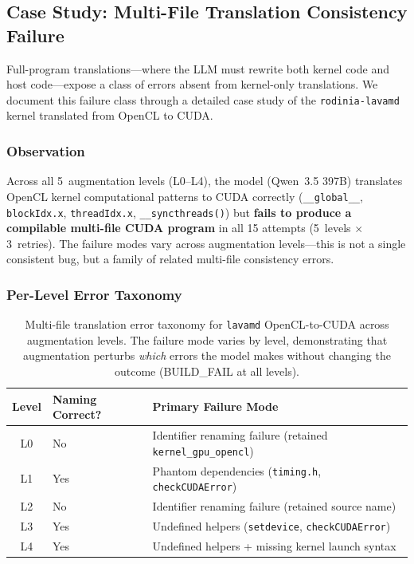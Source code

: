 \subsection{Case Study: Multi-File Translation Consistency Failure}
\label{sec:appendix-c5}

Full-program translations---where the LLM must rewrite both kernel code and host
code---expose a class of errors absent from kernel-only translations. We
document this failure class through a detailed case study of the
\texttt{rodinia-lavamd} kernel translated from OpenCL to CUDA.

\subsubsection*{Observation}

Across all 5~augmentation levels (L0--L4), the model (Qwen~3.5 397B) translates
OpenCL kernel computational patterns to CUDA correctly (\texttt{\_\_global\_\_},
\texttt{blockIdx.x}, \texttt{threadIdx.x}, \texttt{\_\_syncthreads()}) but
\textbf{fails to produce a compilable multi-file CUDA program} in all 15
attempts (5~levels $\times$ 3~retries). The failure modes vary across
augmentation levels---this is not a single consistent bug, but a family of
related multi-file consistency errors.

\subsubsection*{Per-Level Error Taxonomy}

\begin{table}[htbp]
  \centering
  \caption{Multi-file translation error taxonomy for \texttt{lavamd}
    OpenCL-to-CUDA across augmentation levels. The failure mode varies by level,
    demonstrating that augmentation perturbs \emph{which} errors the model makes
    without changing the outcome (BUILD\_FAIL at all levels).}
  \label{tab:lavamd-errors}
  \small
  \begin{tabular}{@{}clp{4.2cm}@{}}
    \toprule
    Level & Naming Correct? & Primary Failure Mode \\
    \midrule
    L0 & No  & Identifier renaming failure (retained \texttt{kernel\_gpu\_opencl}) \\
    L1 & Yes & Phantom dependencies (\texttt{timing.h}, \texttt{checkCUDAError}) \\
    L2 & No  & Identifier renaming failure (retained source name) \\
    L3 & Yes & Undefined helpers (\texttt{setdevice}, \texttt{checkCUDAError}) \\
    L4 & Yes & Undefined helpers + missing kernel launch syntax \\
    \bottomrule
  \end{tabular}
\end{table}

